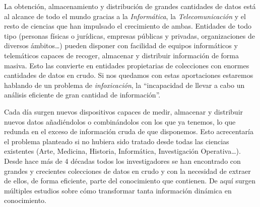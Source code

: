 
\ABIERTO%

La obtención, almacenamiento y distribución de grandes cantidades de datos está al alcance de todo el mundo gracias a la \textsl{Informática}, la \textsl{Telecomunicación} y el resto de ciencias que han impulsado el crecimiento de ambas. Entidades de todo tipo (personas físicas o jurídicas, empresas públicas y privadas, organizaciones de diversos ámbitos\ldots) pueden disponer con facilidad de equipos informáticos y telemáticos capaces de recoger, almacenar y distribuir información de forma masiva. Esto las convierte en entidades propietarias de colecciones con enormes cantidades de datos en crudo. Si nos quedamos con estas aportaciones estaremos hablando de un problema de \textsl{infoxicación}, la "`incapacidad de llevar a cabo un análisis eficiente de gran cantidad de información"'.

Cada día surgen nuevos dispositivos capaces de medir, almacenar y distribuir nuevos datos añadiéndolos o combinándolos con los que ya tenemos, lo que redunda en el exceso de información cruda de que disponemos. Esto acrecentaría el problema planteado si no hubiera sido tratado desde todas las ciencias existentes (Arte, Medicina, Historia, Informática, Investigación Operativa\ldots). Desde hace más de 4 décadas todos los investigadores se han encontrado con grandes y crecientes colecciones  de datos en crudo y con la necesidad de extraer de ellos, de forma eficiente, parte del conocimiento que contienen. De aquí surgen múltiples estudios sobre cómo transformar tanta información dinámica en conocimiento.

